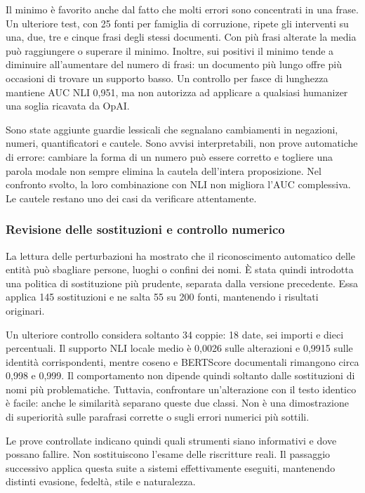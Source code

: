 Il minimo è favorito anche dal fatto che molti errori sono concentrati in una frase. Un ulteriore test, con 25 fonti per famiglia di corruzione, ripete gli interventi su una, due, tre e cinque frasi degli stessi documenti. Con più frasi alterate la media può raggiungere o superare il minimo. Inoltre, sui positivi il minimo tende a diminuire all'aumentare del numero di frasi: un documento più lungo offre più occasioni di trovare un supporto basso. Un controllo per fasce di lunghezza mantiene AUC NLI 0,951, ma non autorizza ad applicare a qualsiasi humanizer una soglia ricavata da OpAI.

Sono state aggiunte guardie lessicali che segnalano cambiamenti in negazioni, numeri, quantificatori e cautele. Sono avvisi interpretabili, non prove automatiche di errore: cambiare la forma di un numero può essere corretto e togliere una parola modale non sempre elimina la cautela dell'intera proposizione. Nel confronto svolto, la loro combinazione con NLI non migliora l'AUC complessiva. Le cautele restano uno dei casi da verificare attentamente.

\subsubsection{Revisione delle sostituzioni e controllo numerico}\label{revisione-delle-sostituzioni-e-controllo-numerico}

La lettura delle perturbazioni ha mostrato che il riconoscimento automatico delle entità può sbagliare persone, luoghi o confini dei nomi. È stata quindi introdotta una politica di sostituzione più prudente, separata dalla versione precedente. Essa applica 145 sostituzioni e ne salta 55 su 200 fonti, mantenendo i risultati originari.

Un ulteriore controllo considera soltanto 34 coppie: 18 date, sei importi e dieci percentuali. Il supporto NLI locale medio è 0,0026 sulle alterazioni e 0,9915 sulle identità corrispondenti, mentre coseno e BERTScore documentali rimangono circa 0,998 e 0,999. Il comportamento non dipende quindi soltanto dalle sostituzioni di nomi più problematiche. Tuttavia, confrontare un'alterazione con il testo identico è facile: anche le similarità separano queste due classi. Non è una dimostrazione di superiorità sulle parafrasi corrette o sugli errori numerici più sottili.

Le prove controllate indicano quindi quali strumenti siano informativi e dove possano fallire. Non sostituiscono l'esame delle riscritture reali. Il passaggio successivo applica questa suite a sistemi effettivamente eseguiti, mantenendo distinti evasione, fedeltà, stile e naturalezza.

